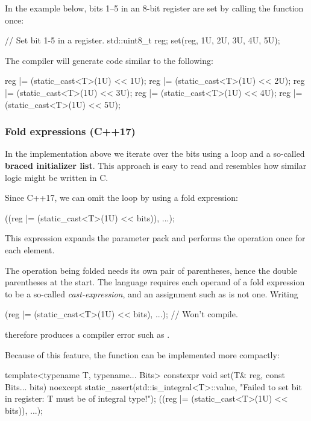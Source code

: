 \noindent In the example below, bits 1--5 in an 8-bit register are set by calling the
 function once:

\begin{cppcode}
// Set bit 1-5 in a register.
std::uint8_t reg{};
set(reg, 1U, 2U, 3U, 4U, 5U);
\end{cppcode}

\noindent The compiler will generate code similar to the following:

\begin{cppcode}
reg |= (static_cast<T>(1U) << 1U);
reg |= (static_cast<T>(1U) << 2U);
reg |= (static_cast<T>(1U) << 3U);
reg |= (static_cast<T>(1U) << 4U);
reg |= (static_cast<T>(1U) << 5U);
\end{cppcode}

\subsubsection{Fold expressions (C++17)}
In the implementation above we iterate over the bits using a loop and a so-called \textbf{braced
initializer list}. This approach is easy to read and resembles how similar logic might be written
in C.

Since C++17, we can omit the loop by using a fold expression:

\begin{cppcode}
((reg |= (static_cast<T>(1U) << bits)), ...);
\end{cppcode}

\noindent This expression expands the parameter pack  and performs the operation once
for each element.

\note The operation being folded needs its own pair of parentheses, hence the double parentheses at
the start. The language requires each operand of a fold expression to be a so-called
\emph{cast-expression}, and an assignment such as  is not one. Writing

\begin{cppcode}
(reg |= (static_cast<T>(1U) << bits), ...); // Won't compile.
\end{cppcode}

\noindent therefore produces a compiler error such as
.

Because of this feature, the  function can be implemented more compactly:

\begin{cppcode}
template<typename T, typename... Bits>
constexpr void set(T& reg, const Bits... bits) noexcept
{
    static_assert(std::is_integral<T>::value,
        "Failed to set bit in register: T must be of integral type!");
    ((reg |= (static_cast<T>(1U) << bits)), ...);
}
\end{cppcode}

